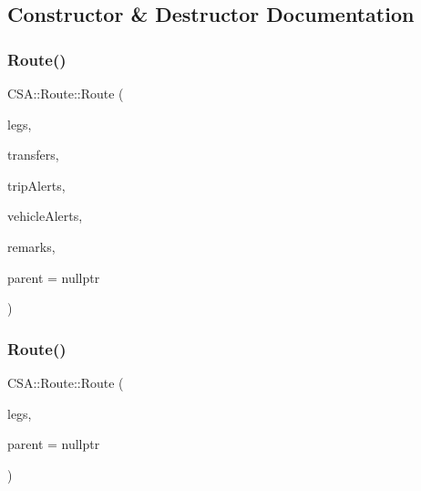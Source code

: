\subsection{Constructor \& Destructor Documentation}
\mbox{\label{classCSA_1_1Route_a285d58821dfce5fe134c928cfb72e56e}} 
\subsubsection{\texorpdfstring{Route()}{Route()}\hspace{0.1cm}{\footnotesize\ttfamily [1/2]}}
{\footnotesize\ttfamily C\+S\+A\+::\+Route\+::\+Route (\begin{DoxyParamCaption}\item[{const Q\+List$<$ \mbox{\hyperlink{classCSA_1_1RouteLeg}{C\+S\+A\+::\+Route\+Leg}} $\ast$$>$ \&}]{legs,  }\item[{const Q\+List$<$ \mbox{\hyperlink{classCSA_1_1Transfer}{C\+S\+A\+::\+Transfer}} $\ast$$>$ \&}]{transfers,  }\item[{const Q\+List$<$ \mbox{\hyperlink{classCSA_1_1Message}{C\+S\+A\+::\+Message}} $\ast$$>$ \&}]{trip\+Alerts,  }\item[{const Q\+List$<$ \mbox{\hyperlink{classCSA_1_1Message}{C\+S\+A\+::\+Message}} $\ast$$>$ \&}]{vehicle\+Alerts,  }\item[{const Q\+List$<$ \mbox{\hyperlink{classCSA_1_1Message}{C\+S\+A\+::\+Message}} $\ast$$>$ \&}]{remarks,  }\item[{Q\+Object $\ast$}]{parent = {\ttfamily nullptr} }\end{DoxyParamCaption})\hspace{0.3cm}{\ttfamily [explicit]}}

\mbox{\label{classCSA_1_1Route_a9c40376e7b67c123f88b9afba8aad6d6}} 
\subsubsection{\texorpdfstring{Route()}{Route()}\hspace{0.1cm}{\footnotesize\ttfamily [2/2]}}
{\footnotesize\ttfamily C\+S\+A\+::\+Route\+::\+Route (\begin{DoxyParamCaption}\item[{const Q\+List$<$ \mbox{\hyperlink{classCSA_1_1RouteLeg}{Route\+Leg}} $\ast$$>$ \&}]{legs,  }\item[{Q\+Object $\ast$}]{parent = {\ttfamily nullptr} }\end{DoxyParamCaption})\hspace{0.3cm}{\ttfamily [explicit]}}



